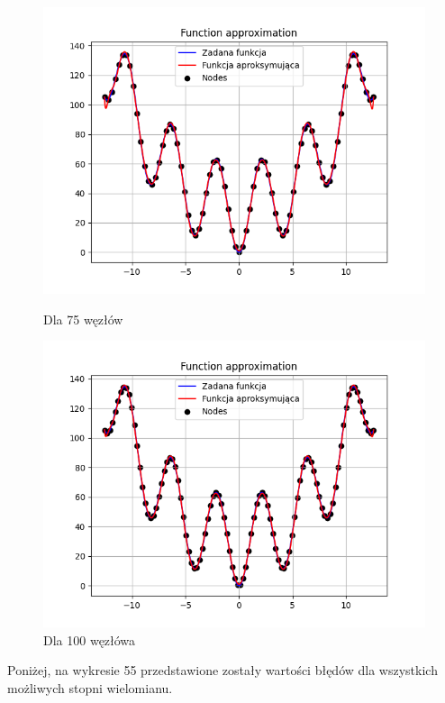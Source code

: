 \documentclass{article}
\begin{document}
\begin{figure}[H]
\begin{minipage}[b]{0.49\textwidth}
    \begin{minipage}[b]{\textwidth}
      \includegraphics[width=\textwidth]{img53.png}
      \caption{Dla 75 węzłów}
    \end{minipage}
    \vspace*{\fill}
    \begin{minipage}[b]{\textwidth}
      \includegraphics[width=\textwidth]{img54.png}
      \caption{Dla 100 węzłówa}
    \end{minipage}
  \end{minipage}
\end{figure}

Poniżej, na wykresie 55 przedstawione zostały wartości błędów dla wszystkich możliwych stopni wielomianu.
\end{document}
